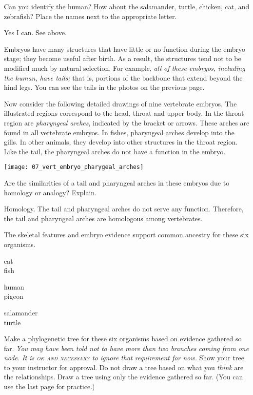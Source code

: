 \documentclass[12pt, hidelinks]{exam}
\newcommand*\AnswerBox[2]{%
    \parbox[t][#1]{0.92\textwidth}{%
    \begin{solution}#2\end{solution}}
    \vspace{\stretch{1}}
}
\begin{document}
\begin{questions}
\question
Can you identify the human? How about the
salamander, turtle, chicken, cat, and zebrafish? Place the names next to the appropriate letter. 

\AnswerBox{2\baselineskip}{Yes I can. See above.}

Embryos have many structures that have little or no
function during the embryo stage; they become useful after birth. As a result, 
the structures tend not to be modified much by natural selection. For example,
\emph{all of these embryos, including the human, have tails;} that is,
portions of the backbone that extend beyond the hind legs. You can see the tails 
in the photos on the previous page.

Now consider the following detailed drawings of nine vertebrate embryos.
The illustrated regions correspond to the head, throat and upper body.
In the throat region are \emph{pharyngeal arches}, indicated by the
bracket or arrows. These arches are found in all vertebrate embryos. 
In fishes, pharyngeal arches develop into the gills. In other animals, 
they develop into other structures in the throat region. Like the tail, the pharyngeal
arches do not have a function in the embryo.

\begin{center}
	\texttt{[image: 07\_vert\_embryo\_pharygeal\_arches]}
\end{center}

\question
Are the similarities of a tail and pharyngeal arches in these embryos due to homology or analogy? Explain.

\AnswerBox{3\baselineskip}{Homology. The tail and pharyngeal arches do not serve any function. Therefore,
the tail and pharyngeal arches are homologous among vertebrates.}

\question
The skeletal features and embryo evidence support common ancestry for these six organisms. 

\begin{multicols}{3}

	cat \\
	fish \columnbreak
	
	human \\
	pigeon \columnbreak
	
	salamander \\
	turtle 
		
\end{multicols}

Make a phylogenetic tree for these six organisms based on evidence gathered so far. \emph{You may have been told not to have more than two branches coming from one node. It is \textsc{ok and necessary} to ignore that requirement for now.} Show your tree to your instructor for approval. Do not draw a tree based on what you \emph{think} are the relationships. Draw a tree using only the evidence gathered so far. (You can use the last page for practice.)


\end{questions}
\end{document}
